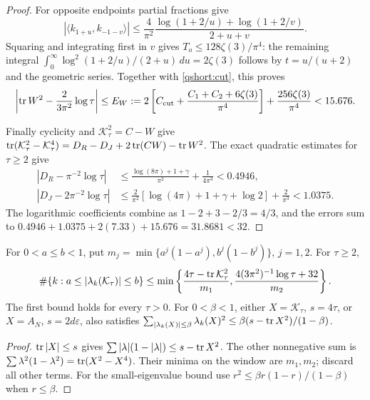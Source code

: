 \begin{proof}
For opposite endpoints partial fractions give
\[
|\langle k_{1+u},k_{-1-v}\rangle|
\le\frac4{\pi^2}
\frac{\log(1+2/u)+\log(1+2/v)}{2+u+v}.
\]
Squaring and integrating first in $v$ gives
$T_o\le128\zeta(3)/\pi^4$:
the remaining integral
$\int_0^\infty\log^2(1+2/u)/(2+u)\,du=2\zeta(3)$
follows by $t=u/(u+2)$ and the geometric series.
Together with \eqref{qshort:cut}, this proves
\begin{equation}\label{qshort:hs-ledger}
\left|\operatorname{tr} W^2-\frac2{3\pi^2}\log\tau\right|
\le E_W:=2\left[C_{\rm cut}+
\frac{C_1+C_2+6\zeta(3)}{\pi^4}\right]
+\frac{256\zeta(3)}{\pi^4}<15.676 .
\end{equation}

Finally cyclicity and $\mathcal K_\tau^2=C-W$ give
$\operatorname{tr}(\mathcal K_\tau^2-\mathcal K_\tau^4)
=D_R-D_J+2\operatorname{tr}(CW)-\operatorname{tr} W^2$.
The exact quadratic estimates for $\tau\ge2$ give
\begin{align*}
\left|D_R-\pi^{-2}\log\tau\right|
&\le\frac{\log(8\pi)+1+\gamma}{\pi^2}+\frac1{4\pi^3}<0.4946,\\
\left|D_J-2\pi^{-2}\log\tau\right|
&\le\frac2{\pi^2}[\log(4\pi)+1+\gamma+\log2]+\frac2{\pi^3}<1.0375.
\end{align*}
The logarithmic coefficients combine as $1-2+3-2/3=4/3$,
and the errors sum to
$0.4946+1.0375+2(7.33)+15.676=31.8681<32$.
\end{proof}

\begin{corollary}
\label{prop:rev:quadratic-count}\label{T11:prop:count}
For $0<a\le b<1$, put
$m_j=\min\{a^j(1-a^j),b^j(1-b^j)\}$, $j=1,2$.
For $\tau\ge2$,
\begin{equation}\label{T11:eq:count}
\#\{k:a\le|\lambda_k(\mathcal K_\tau)|\le b\}
\le\min\left\{\frac{4\tau-\operatorname{tr}\mathcal K_\tau^2}{m_1},
\frac{4(3\pi^2)^{-1}\log\tau+32}{m_2}\right\}.
\end{equation}
The first bound holds for every $\tau>0$.
For $0<\beta<1$, either $X=\mathcal K_\tau$, $s=4\tau$, or
$X=A_N$, $s=2d\varepsilon$, also satisfies
$\sum_{|\lambda_k(X)|\le\beta}\lambda_k(X)^2
\le\beta(s-\operatorname{tr} X^2)/(1-\beta)$.
\end{corollary}
\begin{proof}
$\operatorname{tr}|X|\le s$ gives
$\sum|\lambda|(1-|\lambda|)\le s-\operatorname{tr} X^2$.
The other nonnegative sum is
$\sum\lambda^2(1-\lambda^2)=\operatorname{tr}(X^2-X^4)$.
Their minima on the window are $m_1,m_2$; discard all other terms.
For the small-eigenvalue bound use
$r^2\le\beta r(1-r)/(1-\beta)$ when $r\le\beta$.
\end{proof}


